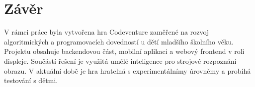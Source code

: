 \chapter{Závěr}

V rámci práce byla vytvořena hra Codeventure zaměřené na rozvoj algoritmických a programovacích dovedností u dětí mladšího školního věku. Projektu obsahuje backendovou část, mobilní aplikaci a webový frontend v roli displeje. Součástí řešení je využitá umělé inteligence pro strojové rozpoznání obrazu. V aktuální době je hra hratelná s experimentálnímy úrovněmy a probíhá testování s dětmi.
